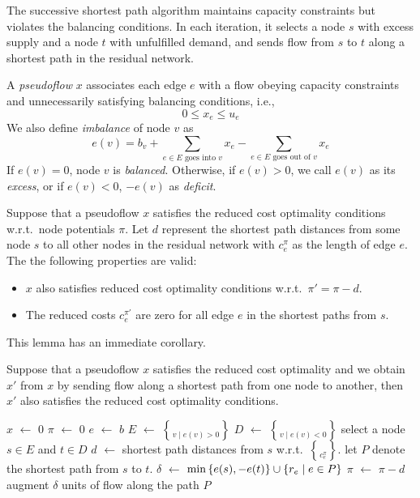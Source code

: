 \documentclass[UTF8,a4paper]{ctexart}
\begin{document}
The successive shortest path algorithm maintains capacity constraints but violates the balancing conditions.
In each iteration, it selects a node $s$ with excess supply and a node $t$ with unfulfilled demand,
and sends flow from $s$ to $t$ along a shortest path in the residual network.

\begin{definition}[pseudoflow]
    A \emph{pseudoflow} $x$ associates each edge $e$ with a flow
    obeying capacity constraints and unnecessarily satisfying balancing conditions,
    i.e.,
    \[
        0\leq x_e \leq u_e
    \]
    We also define \emph{imbalance} of node $v$ as
    \[
        e(v)=b_v + \sum_{e\in E\text{ goes into }v} x_e - \sum_{e\in E\text{ goes out of }v} x_e
    \]
    If $e(v)=0$, node $v$ is \emph{balanced}.
    Otherwise, if $e(v)>0$, we call $e(v)$ as its \emph{excess},
    or if $e(v)<0$, $-e(v)$ as \emph{deficit}.
\end{definition}

\begin{lemma}
    Suppose that a pseudoflow $x$ satisfies the reduced cost optimality conditions w.r.t.\ node potentials $\pi$.
    Let $d$ represent the shortest path distances from some node $s$ to all other nodes
    in the residual network with $c^\pi_e$ as the length of edge $e$.
    The the following properties are valid:
    \begin{itemize}
        \item $x$ also satisfies reduced cost optimality conditions w.r.t.\ $\pi'=\pi-d$.
        \item The reduced costs $c^{\pi'}_e$ are zero for all edge $e$ in the shortest paths from $s$.
    \end{itemize}
\end{lemma}

This lemma has an immediate corollary.

\begin{lemma}
    Suppose that a pseudoflow $x$ satisfies the reduced cost optimality
    and we obtain $x'$ from $x$ by sending flow along a shortest path from one node to another,
    then $x'$ also satisfies the reduced cost optimality conditions.
\end{lemma}

\begin{algorithmic}
        \State $x$ $\gets$ 0
        \State $\pi$ $\gets$ 0
        \State $e$ $\gets$ $b$
        \State $E$ $\gets$ $\brace{v\mid e(v)>0}$
        \State $D$ $\gets$ $\brace{v\mid e(v)<0}$
            \State select a node $s\in E$ and $t\in D$
            \State $d$ $\gets$ shortest path distances from $s$ w.r.t.\ $\brace{c^\pi_e}$.
            \State let $P$ denote the shortest path from $s$ to $t$.
            \State $\delta$ $\gets$ $\min\left\{ e(s), -e(t) \right\}\cup\left\{ r_e \mid e\in P \right\}$
            \State $\pi$ $\gets$ $\pi - d$
            \State augment $\delta$ units of flow along the path $P$
        \EndWhile
    \EndProcedure
\end{algorithmic}
\end{document}
